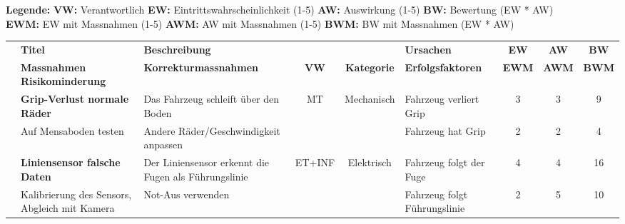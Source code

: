 \documentclass[../main.tex]{subfiles}
\begin{document}
\begin{landscape}
\newpage
\scriptsize

\textbf{Legende:}
\hspace{1cm}
\textbf{VW:} Verantwortlich
\hspace{1cm}
\textbf{EW:} Eintrittswahrscheinlichkeit (1-5)
\hspace{1cm}
\textbf{AW:} Auswirkung (1-5)
\hspace{1cm}
\textbf{BW:} Bewertung (EW * AW)
\\
\vspace{1mm} \hspace{21.5mm}
\textbf{EWM:} EW mit Massnahmen (1-5)
\hspace{1cm}
\textbf{AWM:} AW mit Massnahmen  (1-5)
\hspace{1cm}
\textbf{BWM:} BW mit Massnahmen (EW * AW)


\renewcommand{\arraystretch}{1.5} %
\setlength{\arrayrulewidth}{0.6pt}
\begin{longtable}{|c|p{4.5cm}|p{5cm}|c|c|p{4.5cm}|c|c|c|}
\hline
\rowcolor{white}
& \textbf{Titel} & \textbf{Beschreibung} & & & \textbf{Ursachen} & \textbf{EW} & \textbf{AW} & \textbf{BW} \\ 
\cline{2-3} \cline{6-9}
\rowcolor{white}
\multirow{-2}{*}{\textbf{ID}}
& \textbf{Massnahmen Risikominderung} & \textbf{Korrekturmassnahmen} & \multirow{-2}{*}{\textbf{VW}} & \multirow{-2}{*}{\textbf{Kategorie}} & \textbf{Erfolgsfaktoren} & \textbf{EWM} & \textbf{AWM} & \textbf{BWM} \\ \hline
\endhead

\rowcolor[HTML]{F5F5F5} & \textbf{Grip-Verlust normale Räder} & Das Fahrzeug schleift über den Boden & MT & Mechanisch & Fahrzeug verliert Grip & 3 & 3 & \cellcolor[HTML]{FFFF66}9
\\* \cline{2-3} \cline{6-9}
\rowcolor[HTML]{F5F5F5} \multirow{-2}{*}{R1} & Auf Mensaboden testen & Andere Räder/Geschwindigkeit anpassen & & & Fahrzeug hat Grip & 2 & 2 & \cellcolor[HTML]{CCFF33}4 \\ \hline

\rowcolor{white} & \textbf{Liniensensor falsche Daten} & Der Liniensensor erkennt die Fugen als Führungslinie & ET+INF & Elektrisch & Fahrzeug folgt der Fuge & 4 & 4 & \cellcolor[HTML]{FFC000}16
\\* \cline{2-3} \cline{6-9}
\rowcolor{white} \multirow{-2}{*}{R2} & Kalibrierung des Sensors, Abgleich mit Kamera & Not-Aus verwenden & & & Fahrzeug folgt Führungslinie & 2 & 5 & \cellcolor[HTML]{FFC000}10 \\ \hline


\end{longtable}
\end{landscape}
\end{document}
